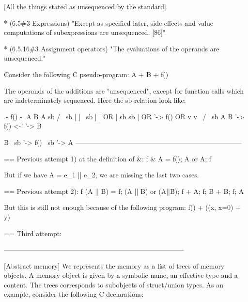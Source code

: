 \documentclass[12pt, a4paper]{article}
\begin{document}
\newpage


[All the things stated as unsequenced by the standard]
  
  * (6.5\#3 Expressions)
      "Except as specified later, side effects and value computations of
       subexpressions are unsequenced. [86]"
  
  * (6.5.16\#3 Assignment operators)
      "The evaluations of the operands are unsequenced."














Consider the following C pseudo-program: A + B + f()

The operands of the additions are "unsequenced", except for function calls which
are indeterminately sequenced. Here the sb-relation look like:
  
       .- f() -.            A             B        A
   sb /         \ sb        |             |         \ sb
     |           |     OR   | sb       sb |   OR     '-> f()        OR
     v           v           \           /                 \ sb
     A           B            '-> f() <-'                   '-> B
   
                            B
                             \ sb
                              '-> f()
                                    \ sb
                                     '-> A
   --------------------------------------------------------------------------

== Previous attempt 1) at the definition of \&:
  f \& A = f(); A or A; f
  
But if we have A = e\_1 || e\_2, we are missing the last two cases.


== Previous attempt 2):
  f (A || B) = f; (A || B) or (A||B); f + A; f; B + B; f; A

But this is still not enough because of the following program:
  f() + ((x, x=0) + y)


== Third attempt:
  




--------------------------------------------------------------------------------

[Abstract memory]
  We represents the memory as a list of trees of memory objects. A memory object
  is given by a symbolic name, an effective type and a content. The trees
  corresponds to subobjects of struct/union types. As an example, consider the
  following C declarations:
    
\end{document}
